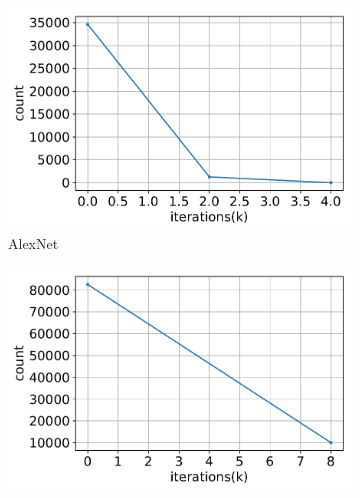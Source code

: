 \documentclass{article}
\begin{document}




\begin{figure}[t]
  \centering
  \begin{subfigure}{.32\textwidth}
    \includegraphics[width=\textwidth]{NeuRIPS2019/images/WOT_new/alexnet_counts.pdf}
    \caption{AlexNet}
  \end{subfigure}
    \begin{subfigure}{.32\textwidth}
    \includegraphics[width=\textwidth]{NeuRIPS2019/images/WOT_new/vgg16_bn_counts.pdf}

\end{subfigure}
\end{figure}
\end{document}
